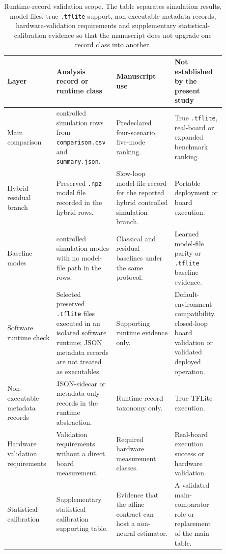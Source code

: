 \documentclass[11pt]{article}
\newcommand{\softwarehil}{controlled simulation}
\begin{document}
\begin{table}[htbp]
\centering
\small
\begin{tabular}{@{}>{\raggedright\arraybackslash}p{0.21\linewidth}>{\raggedright\arraybackslash}p{0.25\linewidth}>{\raggedright\arraybackslash}p{0.25\linewidth}>{\raggedright\arraybackslash}p{0.17\linewidth}@{}}
\toprule
Layer & Analysis record or runtime class & Manuscript use & Not established by the present study \\
\midrule
Main comparison & \softwarehil{} rows from
\texttt{comparison.csv} and \texttt{summary.json}. & Predeclared four-scenario,
five-mode ranking. & True \texttt{.tflite}, real-board or expanded benchmark
ranking. \\
\addlinespace
Hybrid residual branch & Preserved \texttt{.npz} model file recorded in
the hybrid rows. & Slow-loop model-file record for the reported hybrid
\softwarehil{} branch. & Portable deployment or board execution. \\
\addlinespace
Baseline modes & \softwarehil{} modes with no model-file path in the
rows. & Classical and residual baselines under the same protocol. & Learned
model-file parity or \texttt{.tflite} baseline evidence. \\
\addlinespace
Software runtime check & Selected preserved \texttt{.tflite} files executed in
an isolated software runtime; JSON metadata records are not treated as
executables. & Supporting runtime evidence only. & Default-environment
compatibility, closed-loop board validation or validated
deployed operation. \\
\addlinespace
Non-executable metadata records & JSON-sidecar or metadata-only records in
the runtime abstraction. & Runtime-record taxonomy only. & True TFLite execution. \\
\addlinespace
Hardware validation requirements & Validation requirements without a direct board measurement. &
Required hardware measurement classes. &
Real-board execution success or hardware validation. \\
\addlinespace
Statistical calibration & Supplementary statistical-calibration supporting table. &
Evidence that the affine contract can host a non-neural
estimator. & A validated main-comparator role or replacement of the main table. \\
\bottomrule
\end{tabular}
\caption{Runtime-record validation scope.  The table separates simulation
results, model files, true \texttt{.tflite} support, non-executable metadata records,
hardware-validation requirements and supplementary statistical-calibration evidence so that
the manuscript does not upgrade one record class into another.}
\label{tab:runtime-records-scope}
\end{table}
\end{document}
